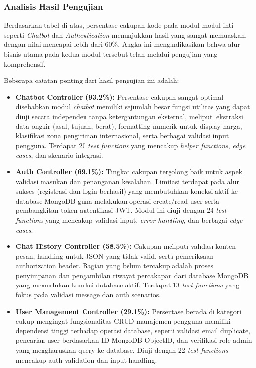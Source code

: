\subsubsection{Analisis Hasil Pengujian}

Berdasarkan tabel di atas, persentase cakupan kode pada modul-modul inti seperti \textit{Chatbot} dan \textit{Authentication} menunjukkan hasil yang sangat memuaskan, dengan nilai mencapai lebih dari 60\%. Angka ini mengindikasikan bahwa alur bisnis utama pada kedua modul tersebut telah melalui pengujian yang komprehensif.

Beberapa catatan penting dari hasil pengujian ini adalah:

\begin{itemize}[leftmargin=*]
    \item \textbf{Chatbot Controller (93.2\%):} Persentase cakupan sangat optimal disebabkan modul \textit{chatbot} memiliki sejumlah besar fungsi utilitas yang dapat diuji secara independen tanpa ketergantungan eksternal, meliputi ekstraksi data ongkir (asal, tujuan, berat), formatting numerik untuk display harga, klasifikasi zona pengiriman internasional, serta berbagai validasi input pengguna. Terdapat 20 \textit{test functions} yang mencakup \textit{helper functions}, \textit{edge cases}, dan skenario integrasi.
    
    \item \textbf{Auth Controller (69.1\%):} Tingkat cakupan tergolong baik untuk aspek validasi masukan dan penanganan kesalahan. Limitasi terdapat pada alur sukses (registrasi dan login berhasil) yang membutuhkan koneksi aktif ke database MongoDB guna melakukan operasi create/read user serta pembangkitan token autentikasi JWT. Modul ini diuji dengan 24 \textit{test functions} yang mencakup validasi input, \textit{error handling}, dan berbagai \textit{edge cases}.
    
    \item \textbf{Chat History Controller (58.5\%):} Cakupan meliputi validasi konten pesan, handling untuk JSON yang tidak valid, serta pemeriksaan authorization header. Bagian yang belum tercakup adalah proses penyimpanan dan pengambilan riwayat percakapan dari database MongoDB yang memerlukan koneksi database aktif. Terdapat 13 \textit{test functions} yang fokus pada validasi message dan auth scenarios.
    
    \item \textbf{User Management Controller (29.1\%):} Persentase berada di kategori cukup mengingat fungsionalitas CRUD manajemen pengguna memiliki dependensi tinggi terhadap operasi database, seperti validasi email duplicate, pencarian user berdasarkan ID MongoDB ObjectID, dan verifikasi role admin yang mengharuskan query ke database. Diuji dengan 22 \textit{test functions} mencakup auth validation dan input handling.
    

\end{itemize}
